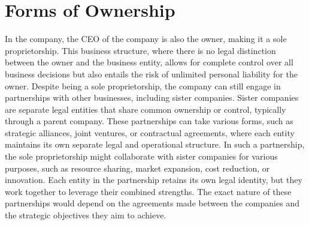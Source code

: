       \section{Forms of Ownership}
      In the company, the CEO of the company is also the owner, making it a sole proprietorship. This business structure, where there is no legal distinction between the owner and the business entity, allows for complete control over all business decisions but also entails the risk of unlimited personal liability for the owner. Despite being a sole proprietorship, the company can still engage in partnerships with other businesses, including sister companies. Sister companies are separate legal entities that share common ownership or control, typically through a parent company. These partnerships can take various forms, such as strategic alliances, joint ventures, or contractual agreements, where each entity maintains its own separate legal and operational structure. In such a partnership, the sole proprietorship might collaborate with sister companies for various purposes, such as resource sharing, market expansion, cost reduction, or innovation. Each entity in the partnership retains its own legal identity, but they work together to leverage their combined strengths. The exact nature of these partnerships would depend on the agreements made between the companies and the strategic objectives they aim to achieve.